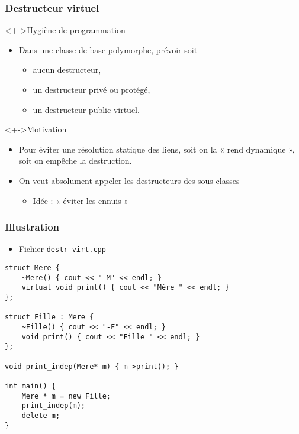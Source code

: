 \begin{frame}
\frametitle{Destructeur virtuel}
\begin{block}<+->{Hygiène de programmation}
	\begin{itemize}[<+->]
	\item Dans une classe de base polymorphe, prévoir soit
		\begin{itemize}
		\item aucun destructeur,
		\item un destructeur privé ou protégé,
		\item un destructeur public virtuel.
		\end{itemize}
	\end{itemize}
\end{block}
\begin{exampleblock}<+->{Motivation}
	\begin{itemize}[<+->]
	\item Pour éviter une résolution statique des liens, soit on la « rend dynamique », soit on empêche la destruction.
	\end{itemize}
\end{exampleblock}
\begin{itemize}[<+->]
\item On veut absolument appeler les destructeurs des sous-classes 
	\begin{itemize}
	\item Idée : « éviter les ennuis »
	\end{itemize}
\end{itemize}
\end{frame}

\begin{frame}[containsverbatim]
\frametitle{Illustration}
\begin{itemize}
\item Fichier \texttt{destr-virt.cpp}
\end{itemize}
\begin{lstlisting}
struct Mere {
	~Mere() { cout << "-M" << endl; }
	virtual void print() { cout << "Mère " << endl; }	
};

struct Fille : Mere {
	~Fille() { cout << "-F" << endl; }
	void print() { cout << "Fille " << endl; }	
};

void print_indep(Mere* m) { m->print(); }

int main() {
	Mere * m = new Fille;
	print_indep(m);
    delete m;
}
\end{lstlisting}
\end{frame}

